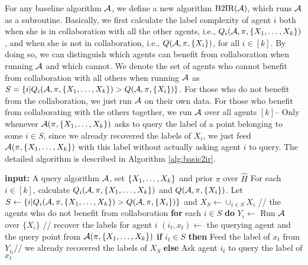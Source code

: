 For any baseline algorithm $\mathcal{A}$, we define a new algorithm $\textrm{B2IR}(\mathcal{A})$, which runs $\mathcal{A}$ as a subroutine.
Basically, we first calculate the label complexity of agent $i$ both when she is in collaboration with all the other agents, i.e., $Q_i(\mathcal{A},\pi,\{X_1,\ldots,X_k\})$,  and when she is not in collaboration, i.e., $Q(\mathcal{A},\pi,\{X_i\})$, for all $i\in [k]$. 
By doing so, we can distinguish which agents can benefit from collaboration when running $\mathcal{A}$ and which cannot. 
We denote the set of agents who cannot benefit from collaboration with all others when running $\mathcal{A}$ as $S = \{i|Q_i(\mathcal{A}, \pi, \{X_1,\ldots,X_k\})>Q(\mathcal{A},\pi,\{X_i\})\}$. 
For those who do not benefit from the collaboration, we just run $\mathcal{A}$ on their own data.
For those who benefit from collaborating  with the others together, we run $\mathcal{A}$ over all agents $[k]$-- 
Only whenever $\mathcal{A}(\pi,\{X_1,\ldots,X_k\})$ asks to query the label of a point belonging to some $i\in S$, since we already recovered the labels of $X_i$, we just  feed $\mathcal{A}(\pi,\{X_1,\ldots,X_k\})$ with this label without actually asking agent $i$ to query.  
The detailed algorithm is described in Algorithm \ref{alg:basic2ir}.


\begin{algorithm}[H]\caption{$\ir$}\label{alg:basic2ir}
    \begin{algorithmic}[1]
    \STATE \textbf{input:} A query algorithm $\mathcal{A}$, set $\{X_1,\ldots,X_k\}$ and prior $\pi$ over $\hat H$
    \STATE For each $i\in[k]$, calculate $Q_i(\mathcal{A},\pi,\{X_1,\ldots,X_k\})$  and $Q(\mathcal{A}, \pi, \{X_i\})$.
    \STATE Let $S \leftarrow \{i|Q_i(\mathcal{A}, \pi, \{X_1,\ldots,X_k\})>Q(\mathcal{A},\pi,\{X_i\})\}$ and $X_S\leftarrow \cup_{i\in S}X_i$ // the agents who do not benefit from collaboration
    \STATE \textbf{for} {each $i\in S$} \textbf{do} $Y_i\leftarrow$ Run $\mathcal{A}$ over $\{X_i\}$ // recover the labels for agent $i$
        \STATE $(i_t,x_t)\leftarrow$ the querying agent and the query point from $\mathcal{A}(\pi, \{X_1,\ldots,X_k\})$
        \STATE \textbf{if} {$i_t\in S$} \textbf{then} Feed the label of $x_t$ from $Y_{i_t}$// we already recovered the labels of $ X_{S}$
        \STATE \textbf{else}
         Ask  agent $i_t$
        to  query the label of $x_t$         
    \ENDFOR
    \end{algorithmic}
\end{algorithm}



